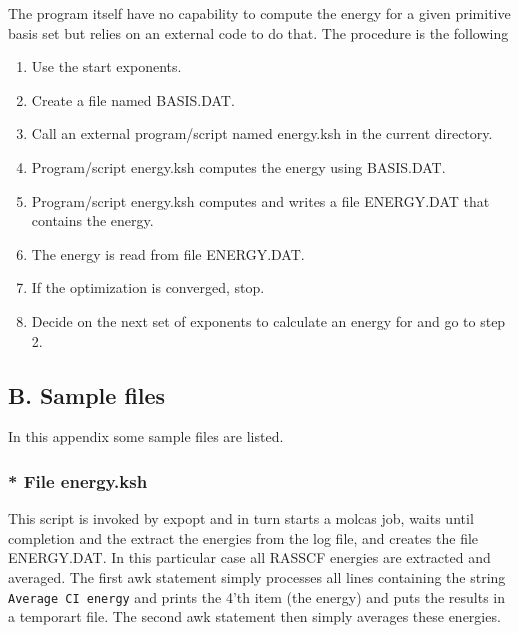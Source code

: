 \documentclass[a4paper,fleqn]{article}
\let\headi=\subsection
\let\headii=\subsubsection
\def\file#1{{\sffamily\upshape\mdseries #1}}
\def\unix#1{{\ttfamily\upshape\mdseries #1}}
\begin{document}
The program itself have no capability to compute the energy for a given
primitive basis set but relies on an external code to do that.
The procedure is the following
\begin{enumerate}
\item Use the start exponents.
\item Create a file named \file{BASIS.DAT}.
\item Call an external program/script named \unix{energy.ksh} in the current directory.
\item Program/script \unix{energy.ksh} computes the energy using \file{BASIS.DAT}.
\item Program/script \unix{energy.ksh} computes and writes a file \file{ENERGY.DAT} that contains the energy.
\item The energy is read from file \file{ENERGY.DAT}.
\item If the optimization is converged, stop.
\item Decide on the next set of exponents to calculate an energy for and go to step 2.
\end{enumerate}
\headi{B. Sample files}
In this appendix some sample files are listed.
\headii{* File \file{energy.ksh}}
\label{sec:energy.ksh}
This script is invoked by expopt and in turn starts a molcas job, waits until
completion and the extract the energies from the log file, and creates the
file \file{ENERGY.DAT}. In this particular case all RASSCF energies are
extracted and averaged. The first awk statement simply processes all lines
containing the string \texttt{Average CI energy} and prints the 4'th item (the energy)
and puts the results in a temporart file. The second awk statement then simply
averages these energies.
\end{document}
